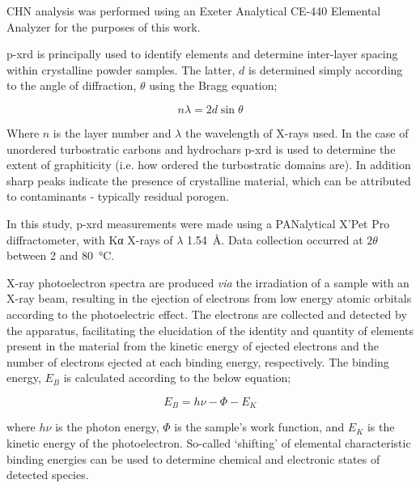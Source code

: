 CHN analysis was performed using an Exeter Analytical CE-440 Elemental Analyzer for the purposes of this work.

\acrfull{p-xrd} is principally used to identify elements and determine inter-layer spacing within crystalline powder samples. The latter, $d$ is determined simply according to the angle of diffraction, $\theta$ using the Bragg equation;

\begin{equation}
    n\lambda = 2 d \sin{\theta}
\end{equation}

Where $n$ is the layer number and $\lambda$ the wavelength of X-rays used.\citep{woolfson1997introduction} In the case of unordered \glspl{turbostratic carbon} and \glspl{hydrochar} \acrshort{p-xrd} is used to determine the extent of graphiticity (i.e. how ordered the turbostratic domains are). In addition sharp peaks indicate the presence of crystalline material, which can be attributed to contaminants - typically residual \gls{porogen}.

In this study, \acrshort{p-xrd} measurements were made using a PANalytical X’Pet Pro diffractometer, with K\textgreek{α} X-rays of $\lambda$ \qty{1.54}{\angstrom}. Data collection occurred at $2\theta$ between \num{2} and \qty{80}{\degreeCelsius}.

X-ray photoelectron spectra are produced \textit{via} the irradiation of a sample with an X-ray beam, resulting in the ejection of electrons from low energy atomic orbitals according to the photoelectric effect\citep{richardson1912liii}. The electrons are collected and detected by the apparatus, facilitating the elucidation of the identity and quantity of elements present in the material from the kinetic energy of ejected electrons and the number of electrons ejected at each binding energy, respectively. The binding energy, $E_B$ is calculated according to the below equation;

\begin{equation}
    E_B = h\nu - \Phi - E_K
\end{equation}

where $h\nu$ is the photon energy, $\Phi$ is the sample’s work function, and $E_K$ is the kinetic energy of the photoelectron. So-called `shifting' of elemental characteristic binding energies can be used to determine chemical and electronic states of detected species.\citep{moulder1995handbook}

